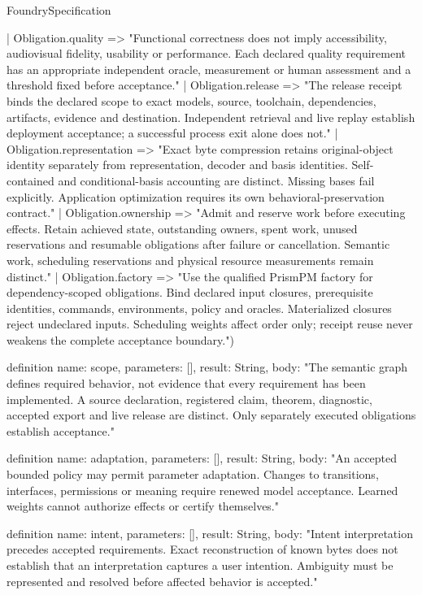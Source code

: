 \begin{lexlean}{FoundrySpecification}
\begin{semanticmodule}
{    | Obligation.quality => "Functional correctness does not imply accessibility, audiovisual fidelity, usability or performance. Each declared quality requirement has an appropriate independent oracle, measurement or human assessment and a threshold fixed before acceptance."
    | Obligation.release => "The release receipt binds the declared scope to exact models, source, toolchain, dependencies, artifacts, evidence and destination. Independent retrieval and live replay establish deployment acceptance; a successful process exit alone does not."
    | Obligation.representation => "Exact byte compression retains original-object identity separately from representation, decoder and basis identities. Self-contained and conditional-basis accounting are distinct. Missing bases fail explicitly. Application optimization requires its own behavioral-preservation contract."
    | Obligation.ownership => "Admit and reserve work before executing effects. Retain achieved state, outstanding owners, spent work, unused reservations and resumable obligations after failure or cancellation. Semantic work, scheduling reservations and physical resource measurements remain distinct."
    | Obligation.factory => "Use the qualified PrismPM factory for dependency-scoped obligations. Bind declared input closures, prerequisite identities, commands, environments, policy and oracles. Materialized closures reject undeclared inputs. Scheduling weights affect order only; receipt reuse never weakens the complete acceptance boundary.")
}

definition{
  name: scope,
  parameters: [],
  result: String,
  body: "The semantic graph defines required behavior, not evidence that every requirement has been implemented. A source declaration, registered claim, theorem, diagnostic, accepted export and live release are distinct. Only separately executed obligations establish acceptance."
}

definition{
  name: adaptation,
  parameters: [],
  result: String,
  body: "An accepted bounded policy may permit parameter adaptation. Changes to transitions, interfaces, permissions or meaning require renewed model acceptance. Learned weights cannot authorize effects or certify themselves."
}

definition{
  name: intent,
  parameters: [],
  result: String,
  body: "Intent interpretation precedes accepted requirements. Exact reconstruction of known bytes does not establish that an interpretation captures a user intention. Ambiguity must be represented and resolved before affected behavior is accepted."
}


\end{semanticmodule}
\end{lexlean}
